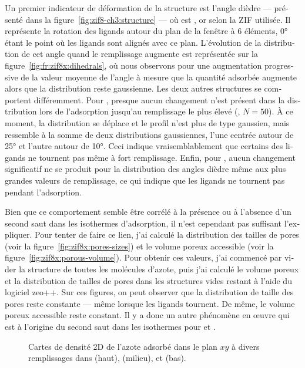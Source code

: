 \documentclass[thesis]{subfiles}
\begin{document}
\begin{otherlanguage}{french}
Un premier indicateur de déformation de la structure est l'angle dièdre
 --- présenté dans la figure~\ref{fig:zif8-ch3:structure}
--- où  est ,  or  selon la ZIF utilisée. Il
représente la rotation des ligands autour du plan de la fenêtre à 6 éléments, 0°
étant le point où les ligands sont alignés avec ce plan. L'évolution de la
distribution de cet angle quand le remplissage augmente est représentée sur la
figure~\ref{fig:fr:zif8x:dihedrals}, où nous observons pour  une
augmentation progressive de la valeur moyenne de l'angle à mesure que la
quantité adsorbée augmente alors que la distribution reste gaussienne. Les deux
autres structures se comportent différemment. Pour \ZIFCl, presque aucun
changement n'est présent dans la distribution lors de l'adsorption jusqu'au
remplissage le plus élevé (\ie, $N = 50$). À ce moment, la distribution se
déplace et le profil n'est plus de type gaussien, mais ressemble à la somme de
deux distributions gaussiennes, l'une centrée autour de 25° et l'autre autour de
10°. Ceci indique vraisemblablement que certains des ligands ne tournent pas
même à fort remplissage. Enfin, pour \ZIFBr, aucun changement significatif ne se
produit pour la distribution des angles dièdre même aux plus grandes valeurs de
remplissage, ce qui indique que les ligands ne tournent pas pendant
l'adsorption.

Bien que ce comportement semble être corrélé à la présence ou à l'absence d'un
second saut dans les isothermes d'adsorption, il n'est cependant pas suffisant
l'expliquer. Pour tenter de faire ce lien, j'ai calculé la distribution des
tailles de pores (voir la figure~\ref{fig:zif8x:pores-sizes}) et le volume
poreux accessible (voir la figure~\ref{fig:zif8x:porous-volume}). Pour obtenir
ces valeurs, j'ai commencé par vider la structure de toutes les molécules
d'azote, puis j'ai calculé le volume poreux et la distribution de tailles de
pores dans les structures vides restant à l'aide du logiciel
zeo++\cite{Willems2012}. Sur ces figures, on peut observer que la distribution
de taille des pores reste constante --- même lorsque les ligands tournent. De
même, le volume poreux accessible reste constant. Il y a donc un autre phénomène
en œuvre qui est à l'origine du second saut dans les isothermes pour  et
\ZIFCl.

\begin{figure}[ht]
    \centering
    
    \caption{Cartes de densité 2D de l'azote adsorbé dans le plan $xy$
    à divers remplissages dans  (haut), \ZIFCl (milieu), et \ZIFBr
    (bas).}
    \label{fig:fr:zif8x:density}
\end{figure}


\end{otherlanguage}
\end{document}
